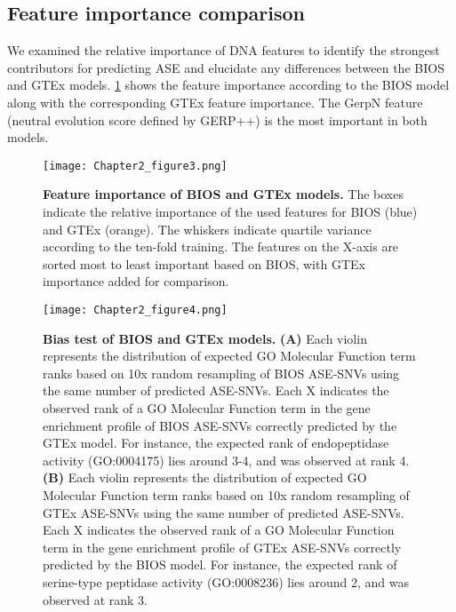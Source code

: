 \documentclass{book}
\begin{document}
\begin{refsection}
\subsection*{Feature importance comparison}
We examined the relative importance of DNA features to identify the strongest contributors for predicting ASE and elucidate any differences between the BIOS and GTEx models.
\ref{fig:figure3} shows the feature importance according to the BIOS model along with the corresponding GTEx feature importance.
The GerpN feature (neutral evolution score defined by GERP++) is the most important in both models.

\begin{landscape}
  \begin{figure}
  \texttt{[image: Chapter2\_figure3.png]}
  \caption{
    \label{fig:figure3} \textbf{Feature importance of BIOS and GTEx models.}
    The boxes indicate the relative importance of the used features for BIOS (blue) and GTEx (orange).
    The whiskers indicate quartile variance according to the ten-fold training.
    The features on the X-axis are sorted most to least important based on BIOS, with GTEx importance added for comparison.
  }
  \end{figure}
\end{landscape}

\begin{figure}[!bht]
  \texttt{[image: Chapter2\_figure4.png]}
  \caption{
    \label{fig:figure4} \textbf{Bias test of BIOS and GTEx models.}
    \textbf{(A)} Each violin represents the distribution of expected GO Molecular Function term ranks based on 10x random resampling of BIOS ASE-SNVs using the same number of predicted ASE-SNVs.
    Each X indicates the observed rank of a GO Molecular Function term in the gene enrichment profile of BIOS ASE-SNVs correctly predicted by the GTEx model.
    For instance, the expected rank of endopeptidase activity (GO:0004175) lies around 3-4, and was observed at rank 4.
    \textbf{(B)} Each violin represents the distribution of expected GO Molecular Function term ranks based on 10x random resampling of GTEx ASE-SNVs using the same number of predicted ASE-SNVs.
    Each X indicates the observed rank of a GO Molecular Function term in the gene enrichment profile of GTEx ASE-SNVs correctly predicted by the BIOS model.
    For instance, the expected rank of serine-type peptidase activity (GO:0008236) lies around 2, and was observed at rank 3.
  }
\end{figure}


\end{refsection}
\end{document}
